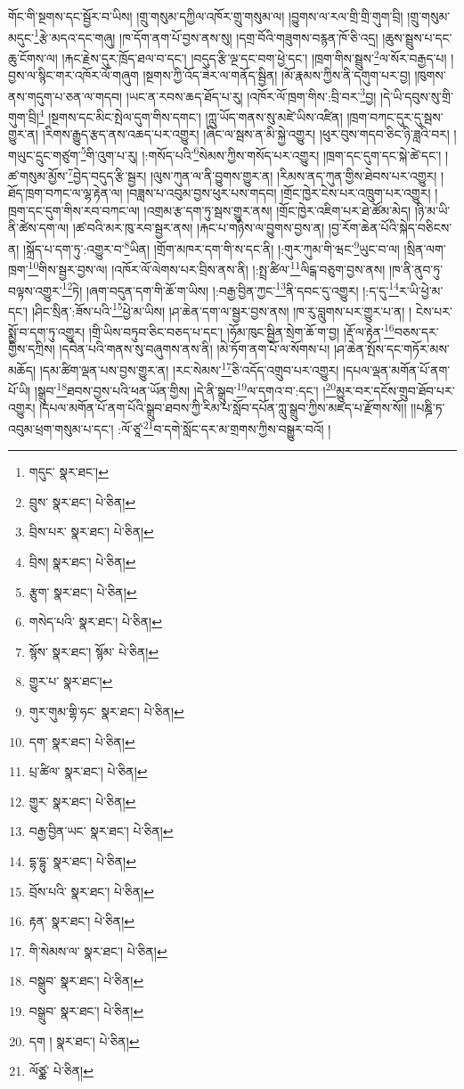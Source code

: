 གོང་གི་སྔགས་དང་སྦྱོར་བ་ཡིས། །གྲུ་གསུམ་དཀྱིལ་འཁོར་གྲུ་གསུམ་ལ། །བྱུགས་ལ་རལ་གྲི་གྲི་གུག་བྲི། །གྲུ་གསུམ་མདུང་\footnote{གདུང་  སྣར་ཐང་། }རྩེ་མདའ་དང་གཞུ། །ཁ་དོག་ནག་པོ་བྱས་ནས་སུ། །དགྲ་བོའི་གཟུགས་བརྙན་ཁོ་ཅི་འདྲ། །ཆུས་སྦྲུས་པ་དང་ཆུ་ངོགས་ལ། །རྐང་རྗེས་དུར་ཁྲོད་ཐལ་བ་དང་། །བདུད་རྩི་ལྔ་དང་བག་ཕྱེ་དང་། །ཁྲག་གིས་སྦྲུས་\footnote{བྲུས་  སྣར་ཐང་།  པེ་ཅིན། }ལ་སོར་བརྒྱད་པ། །བྱས་ལ་སྙིང་གར་འཁོར་ལོ་གཞུག །སྔགས་ཀྱི་འོད་ཟེར་ལ་གནོད་སྦྱིན། །མོ་རྣམས་ཀྱིས་ནི་དགུག་པར་བྱ། །ཁུགས་ནས་གདུག་པ་ཅན་ལ་གདབ། །ཡང་ན་རབས་ཆད་ཐོད་པ་རུ། །འཁོར་ལོ་ཁྲག་གིས་:བྲི་བར་\footnote{བྲིས་པར་  སྣར་ཐང་།  པེ་ཅིན། }བྱ། །དེ་ཡི་དབུས་སུ་གྲི་གུག་བྲི།\footnote{བྲིས།  སྣར་ཐང་།  པེ་ཅིན། } །སྔགས་དང་མིང་སྤེལ་དུག་གིས་དགང་། །ཀླུ་ཡོད་གནས་སུ་མཛེ་ཡིས་འཛིན། །ཁྲག་བཀང་དུར་དུ་སྦས་གྱུར་ན། །རིགས་རྒྱུད་རྩད་ནས་འཆད་པར་འགྱུར། །ཞིང་ལ་སྦས་ན་མི་སྐྱེ་འགྱུར། །ཕུར་བུས་གདབ་ཅིང་ཉི་ཟླའི་བར། །གཡུང་དྲུང་གཙུག་\footnote{རྩུག་  སྣར་ཐང་།  པེ་ཅིན། }གི་འུག་པ་རུ། །:གསོད་པའི་\footnote{གསེད་པའི་  སྣར་ཐང་།  པེ་ཅིན། }སེམས་ཀྱིས་གསོད་པར་འགྱུར། །ཁྲག་དང་དུག་དང་སྐེ་ཚེ་དང་། །ཚ་གསུམ་མྱོས་\footnote{སྙོས་  སྣར་ཐང་། སྙོམ་  པེ་ཅིན། }བྱེད་བདུད་རྩི་སྦྱར། །ལུས་ཀུན་ལ་ནི་བྱུགས་གྱུར་ན། །རིམས་ནད་ཀུན་གྱིས་ཐེབས་པར་འགྱུར། །ཐོད་ཁྲག་བཀང་ལ་ལྷ་རྟེན་ལ། །བཟླས་པ་འབུམ་བྱས་ཕུར་པས་གདབ། །གྲོང་ཁྱེར་ངེས་པར་འཁྲུག་པར་འགྱུར། །ཁྲག་དང་དུག་གིས་རབ་བཀང་ལ། །འགྲམ་རྩ་དག་ཏུ་སྦས་གྱུར་ནས། །གྲོང་ཁྱེར་འཇིག་པར་ཐེ་ཚོམ་མེད། །ཉི་མ་ཡི་ནི་ཚེས་དག་ལ། །ཚ་བའི་མར་ཁུ་རབ་སྦྱར་ནས། །རྐང་པ་གཉིས་ལ་བྱུགས་བྱས་ན། །བྱ་རོག་ཆེན་པོའི་སྐེད་བཅིངས་ན། །སྐྲོད་པ་དག་ཏུ་:འགྱུར་བ་\footnote{གྱུར་པ་  སྣར་ཐང་། }ཡིན། །གྲོག་མཁར་དག་གི་ས་དང་ནི། །:གུར་ཀུམ་གི་ཝང་\footnote{གུར་གུམ་གྷི་ཧང་  སྣར་ཐང་།  པེ་ཅིན། }ཡུང་བ་ལ། །སྲིན་ལག་ཁྲག་\footnote{དག་  སྣར་ཐང་།  པེ་ཅིན། }གིས་སྦྱར་བྱས་ལ། །འཁོར་ལོ་ལེགས་པར་བྲིས་ནས་ནི། །:སྤྲ་ཚིལ་\footnote{པྲ་ཚིལ་  སྣར་ཐང་།  པེ་ཅིན། }ལིངྒ་བཅུག་བྱས་ནས། །ཁ་ནི་ནུབ་ཏུ་བལྟས་འགྱུར་\footnote{གྱུར་  སྣར་ཐང་།  པེ་ཅིན། }ཏེ། །ཞག་བདུན་དག་གི་ཆོ་ག་ཡིས། །:བརྒྱ་བྱིན་ཀྱང་\footnote{བརྒྱ་བྱིན་ཡང་  སྣར་ཐང་།  པེ་ཅིན། }ནི་དབང་དུ་འགྱུར། །:ད་དུ་\footnote{དྷ་དྷུ་  སྣར་ཐང་།  པེ་ཅིན། }ར་ཡི་ཕྱེ་མ་དང་། །ཤིང་སྲིན་:ཟོས་པའི་\footnote{བྲོས་པའི་  སྣར་ཐང་།  པེ་ཅིན། }ཕྱེ་མ་ཡིས། །ཤ་ཆེན་དག་ལ་སྦྱར་བྱས་ནས། །ཁ་རུ་བླུགས་པར་གྱུར་པ་ན། །
ངེས་པར་སྨྱོ་བ་དག་ཏུ་འགྱུར། །གྲི་ཡིས་བཏུབ་ཅིང་བཅད་པ་དང་། །ཧོམ་ཁུང་སྦྱིན་སྲེག་ཆོ་ག་བྱ། །རྡོ་ལ་རྟེན་\footnote{རྟན་  སྣར་ཐང་།  པེ་ཅིན། }བཅས་དར་གྱིས་དཀྲིས། །དབེན་པའི་གནས་སུ་བཞུགས་ནས་ནི། །མེ་ཏོག་ནག་པོ་ལ་སོགས་པ། །ཤ་ཆེན་སྤོས་དང་གཏོར་མས་མཆོད། །དམ་ཚིག་ལྡན་པས་བྱས་གྱུར་ན། །རང་སེམས་\footnote{གི་སེམས་ལ་  སྣར་ཐང་།  པེ་ཅིན། }ཅི་འདོད་འགྲུབ་པར་འགྱུར། །དཔལ་ལྡན་མགོན་པོ་ནག་པོ་ཡི། །སྒྲུབ་\footnote{བསྒྲུབ་  སྣར་ཐང་།  པེ་ཅིན། }ཐབས་བྱས་པའི་ཕན་ཡོན་གྱིས། །དེ་ནི་སྒྲུབ་\footnote{བསྒྲུབ་  སྣར་ཐང་།  པེ་ཅིན། }ལ་དགའ་བ་:དང་། །\footnote{དག །  སྣར་ཐང་།  པེ་ཅིན། }མྱུར་བར་དངོས་གྲུབ་ཐོབ་པར་འགྱུར། །དཔལ་མགོན་པོ་ནག་པོའི་སྒྲུབ་ཐབས་ཀྱི་རིམ་པ་སློབ་དཔོན་ཀླུ་སྒྲུབ་ཀྱིས་མཛད་པ་རྫོགས་སོ།། །།པཎྜི་ཏ་འབུམ་ཕྲག་གསུམ་པ་དང་། :ལོ་ཙཱ་\footnote{ལོཙྪ་  པེ་ཅིན། }བ་དགེ་སློང་དར་མ་གྲགས་ཀྱིས་བསྒྱུར་བའོ། ། 